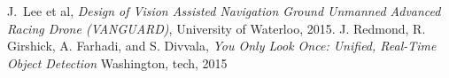 \documentclass[11pt,journal]{IEEEtran}
\begin{document}
%
%
%
\begin{thebibliography}{1}

J.~Lee et al, \emph{Design of Vision Assisted Navigation Ground Unmanned Advanced Racing Drone (VANGUARD)}, University of Waterloo, 2015.
J. Redmond, R. Girshick, A. Farhadi, and S. Divvala, \emph{You Only Look Once: Unified, Real-Time Object Detection} Washington, tech, 2015


\end{thebibliography}

% 







\end{document}
